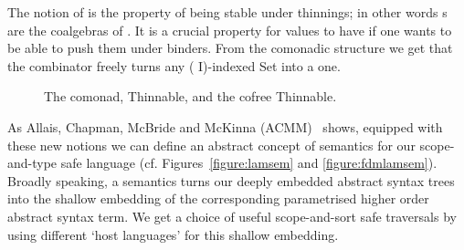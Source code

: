 The notion of  is the property of being stable under thinnings;
in other words s are the coalgebras of .
It is a crucial property for values to have if one wants to be able to push
them under binders. From the comonadic structure we get that
the  combinator freely turns any ( I)-indexed Set into a
 one.

\begin{figure}[h]
\begin{minipage}{0.45\textwidth}
\end{minipage}\hfill
\begin{minipage}{0.45\textwidth}
\end{minipage}

\begin{minipage}{0.25\textwidth}
\end{minipage}\hfill
\begin{minipage}{0.35\textwidth}
\end{minipage}\hfill
\begin{minipage}{0.30\textwidth}
\end{minipage}

\caption{The  comonad, Thinnable, and the cofree Thinnable.}
\end{figure}

As Allais, Chapman, McBride and McKinna (ACMM)~\citeyear{allais2017type} shows,
equipped with these new notions
we can define an abstract concept of semantics for our scope-and-type safe language
(cf. Figures~\ref{figure:lamsem} and \ref{figure:fdmlamsem}).
Broadly speaking, a semantics turns our deeply embedded abstract
syntax trees into the shallow embedding of the corresponding
parametrised higher order abstract syntax term. We get a choice of
useful scope-and-sort safe traversals by using different `host languages'
for this shallow embedding.

